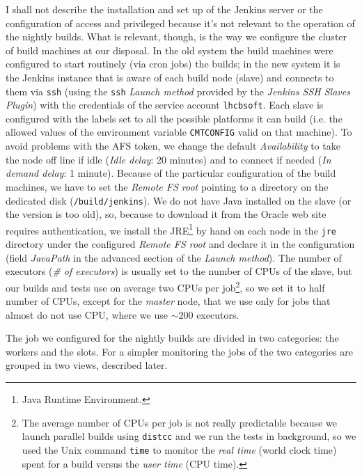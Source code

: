 \documentclass{lhcbnote}
\begin{document}
I shall not describe the installation and set up of the Jenkins server or the
configuration of access and privileged because it's not relevant to the
operation of the nightly builds.  What is relevant, though, is the way we
configure the cluster of build machines at our disposal.  In the old system the
build machines were configured to start routinely (via cron jobs) the builds; in
the new system it is the Jenkins instance that is aware of each build node
(slave) and connects to them via \texttt{ssh} (using the \texttt{ssh}
\emph{Launch method} provided by the \emph{Jenkins SSH Slaves Plugin}) with the
credentials of the service account \texttt{lhcbsoft}.  Each slave is configured
with the labels set to all the possible platforms it can build (i.e. the allowed
values of the environment variable \texttt{CMTCONFIG} valid on that machine).
To avoid problems with the AFS token, we change the default \emph{Availability}
to take the node off line if idle (\emph{Idle delay}: 20 minutes) and to connect
if needed (\emph{In demand delay}: 1 minute).  Because of the particular
configuration of the build machines, we have to set the \emph{Remote FS root}
pointing to a directory on the dedicated disk (\texttt{/build/jenkins}).  We do
not have Java installed on the slave (or the version is too old), so, because to
download it from the Oracle web site requires authentication, we install the
JRE\footnote{Java Runtime Environment\cite{JRE}.} by hand on each node in the
\texttt{jre} directory under the configured \emph{Remote FS root} and declare it
in the configuration (field \emph{JavaPath} in the advanced section of the
\emph{Launch method}).  The number of executors (\emph{\# of executors}) is
usually set to the number of CPUs of the slave, but our builds and tests use on
average two CPUs per job\footnote{The average number of CPUs per job is not
  really predictable because we launch parallel builds using
  \texttt{distcc}\cite{distcc,distccCERN} and we run the tests in background, so
  we used the Unix command \texttt{time} to monitor the \emph{real time} (world
  clock time) spent for a build versus the \emph{user time} (CPU time).},
so we set it to half number of CPUs, except for the \emph{master} node, that we
use only for jobs that almost do not use CPU, where we use $\sim200$ executors.

The job we configured for the nightly builds are divided in two categories: the
workers and the slots.  For a simpler monitoring the jobs of the two categories
are grouped in two views, described later.
\end{document}
